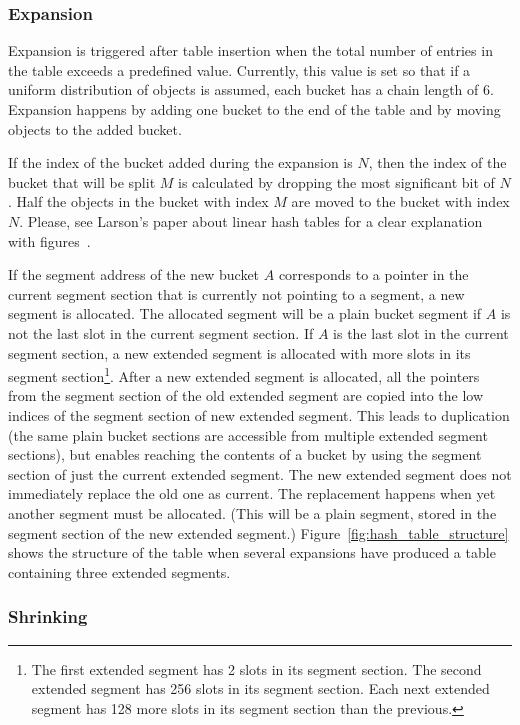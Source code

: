 \documentclass[aps,pre,preprint,nofootinbib]{revtex4}
\begin{document}
\subsubsection{Expansion}

Expansion is triggered after table insertion when the total number of entries in the table exceeds a predefined value.
Currently, this value is set so that if a uniform distribution of objects is assumed, each bucket has a chain length of 6.
Expansion happens by adding one bucket to the end of the table and by moving objects to the added bucket.

If the index of the bucket added during the expansion is $N$, then the index of the bucket that will be split $M$ is calculated by dropping the most significant bit of $N$.
Half the objects in the bucket with index  $M$ are moved to the bucket with index $N$.
Please, see Larson's paper about linear hash tables for a clear explanation with figures~\cite{Larson}.

If the segment address of the new bucket $A$ corresponds to a pointer in the current segment section that is currently not pointing to a segment, a new segment is allocated.
The allocated segment will be a plain bucket segment if $A$ is not the last slot in the current segment section.
If $A$ is the last slot in the current segment section, a new extended segment is allocated with more slots in its segment section\footnote{
  The first extended segment has 2 slots in its segment section.
  The second extended segment has 256 slots in its segment section.
  Each next extended segment has 128 more slots in its segment section than the previous.
}.
After a new extended segment is allocated, all the pointers from the segment section of the old extended segment are copied into the low indices of the segment section of new extended segment.
This leads to duplication (the same plain bucket sections are accessible from multiple extended segment sections), but enables reaching the contents of a bucket by using the segment section of just the current extended segment.
The new extended segment does not immediately replace the old one as current.
The replacement happens when yet another segment must be allocated.
(This will be a plain segment, stored in the segment section of the new extended segment.)
Figure~\ref{fig:hash_table_structure} shows the structure of the table when several expansions have produced a table containing three extended segments. 

\subsubsection{Shrinking}
\end{document}
